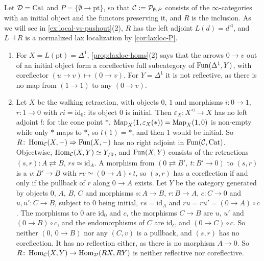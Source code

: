 \begin{exmp}
\label{ex:laxloc-homs}
%
Let $\mathcal{D} = \mathrm{Cat}$ and
$P = \{\emptyset \to \mathrm{pt}\}$,
so that
$\mathcal{C} := \mathcal{P}_{\emptyset,P}$
consists of the $\infty$-categories with an
initial object and the functors preserving it, and $R$ is the inclusion. As we
will see in \cref{ex:local-vs-pushout}(2), $R$ has the left adjoint
$L(d) = d^{\triangleleft}$,
and $L \dashv R$ is a normalized lax localization by \cref{cor:laxloc-P}.
\begin{enumerate}
\item For
$X = L(\mathrm{pt}) = \Delta^{1}$,
\cref{prop:laxloc-homs}(2) says
that the arrows $0 \to v$ out of an initial object form a coreflective full
subcategory of $\operatorname{Fun}(\Delta^{1},Y)$, with coreflector
$(u \to v) \mapsto (0 \to v)$.
For $Y = \Delta^{1}$ it is not reflective, as there is no map from
$(1 \to 1)$
to any
$(0 \to v)$.
\item Let $X$ be the walking retraction, with objects $0$, $1$ and morphisms
$i\colon 0 \to 1$,
$r\colon 1 \to 0$
with
$ri = \mathrm{id}_{0}$;
its object $0$ is initial. Then
$\varepsilon_{X}\colon X^{\triangleleft} \to X$
has no left adjoint $l$: for the cone point $\ast$,
$\operatorname{Map}_{X}(1,\varepsilon_{X}(\ast)) = \operatorname{Map}_{X}(1,0)$
is non-empty while only $\ast$ maps to $\ast$, so $l(1) = \ast$, and then $1$
would be initial. So
$R\colon \operatorname{Hom}_{\mathcal{C}}(X,-) \Rightarrow \operatorname{Fun}(X,-)$
has no right adjoint in $\operatorname{Fun}(\mathcal{C},\mathrm{Cat})$. Objectwise,
$\operatorname{Hom}_{\mathcal{C}}(X,Y) \simeq Y_{/0}$,
and $\operatorname{Fun}(X,Y)$ consists of the retractions
$(s,r)\colon A \rightleftarrows B$,
$rs \simeq \mathrm{id}_{A}$.
A morphism from
$(0 \rightleftarrows B',\ t\colon B' \to 0)$
to $(s,r)$ is a
$v\colon B' \to B$
with
$rv \simeq (0 \to A) \circ t$,
so $(s,r)$ has a coreflection if and only if the pullback of $r$ along
$0 \to A$
exists. Let $Y$ be the category generated by objects $0$, $A$, $B$, $C$ and
morphisms
$s\colon A \to B$,
$r\colon B \to A$,
$c\colon C \to 0$
and
$u,u'\colon C \to B$,
subject to $0$ being initial,
$rs = \mathrm{id}_{A}$
and
$ru = ru' = (0 \to A) \circ c$.
The morphisms to $0$ are $\mathrm{id}_{0}$ and $c$, the morphisms
$C \to B$ are $u$, $u'$ and
$(0 \to B) \circ c$,
and the endomorphisms of $C$ are $\mathrm{id}_{C}$ and
$(0 \to C) \circ c$.
So neither
$(0,\ 0 \to B)$
nor any $(C,v)$ is a pullback, and $(s,r)$ has no coreflection. It has no
reflection either, as there is no morphism $A \to 0$. So
$R\colon \operatorname{Hom}_{\mathcal{C}}(X,Y) \to \operatorname{Hom}_{\mathcal{D}}(RX,RY)$
is neither reflective nor coreflective.
\end{enumerate}
\end{exmp}

